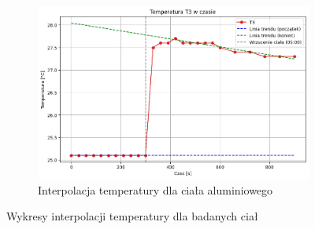 \documentclass[a4paper,12pt]{article}
\begin{document}
\begin{figure}[H]
    \begin{subfigure}[b]{0.65\textwidth}
        \includegraphics[width=\textwidth]{t3_interpolacja.png}
        \caption{Interpolacja temperatury dla ciała aluminiowego}
        \label{fig:t3_interpolacja}
    \end{subfigure}
    \caption{Wykresy interpolacji temperatury dla badanych ciał}
\end{figure}






\end{document}
